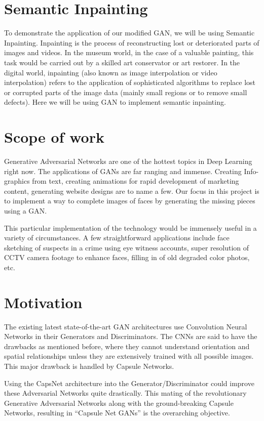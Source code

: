 \section{Semantic Inpainting} %
\label{sec:semantic_inpainting}
To demonstrate the application of our modified GAN, we will be using Semantic Inpainting. Inpainting is the process of reconstructing lost or deteriorated parts of images and videos. In the museum world, in the case of a valuable painting, this task would be carried out by a skilled art conservator or art restorer. In the digital world, inpainting (also known as image interpolation or video interpolation) refers to the application of sophisticated algorithms to replace lost or corrupted parts of the image data (mainly small regions or to remove small defects). Here we will be using GAN to implement semantic inpainting.

\section{Scope of work} %
\label{sec:scope_of_work}
Generative Adversarial Networks are one of the hottest topics in Deep Learning right now. The applications of GANs are far ranging and immense. Creating Info-graphics from text, creating animations for rapid development of marketing content, generating website designs are to name a few. Our focus in this project is to implement a way to complete images of faces by generating the missing pieces using a GAN. 

\par\bigskip
This particular implementation of the technology would be immensely useful in a variety of circumstances. A few straightforward applications include face sketching of suspects in a crime using eye witness accounts, super resolution of CCTV camera footage to enhance faces, filling in of old degraded color photos, etc.

\section{Motivation} %
\label{sec:motivation}
The existing latest state-of-the-art GAN architectures use Convolution Neural Networks in their Generators and Discriminators. The CNNs are said to have the drawbacks as mentioned before, where they cannot understand orientation and spatial relationships unless they are extensively trained with all possible images. This major drawback is handled by Capsule Networks.\par\bigskip
Using the CapsNet architecture into the Generator/Discriminator could improve these Adversarial Networks quite drastically. This mating of the revolutionary Generative Adversarial Networks along with the ground-breaking Capsule Networks, resulting in “Capsule Net GANs” is the overarching objective.
